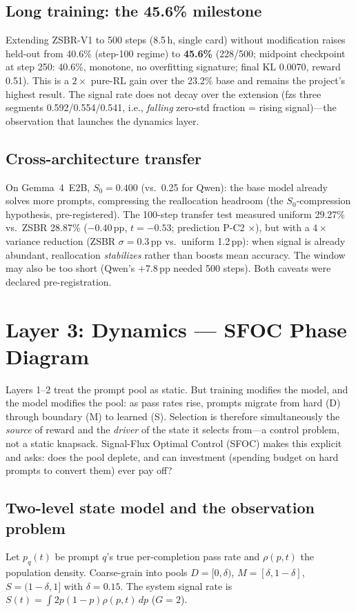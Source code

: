 \documentclass[11pt]{article}
\theoremstyle{definition}
\begin{document}
\subsection{Long training: the 45.6\% milestone}\label{sec:l2-long}
Extending ZSBR-V1 to 500 steps (8.5\,h, single card) without modification raises
held-out from 40.6\% (step-100 regime) to \textbf{45.6\%} (228/500; midpoint
checkpoint at step 250: 40.6\%, monotone, no overfitting signature; final KL
0.0070, reward 0.51). This is a $2\times$ pure-RL gain over the 23.2\% base and
remains the project's highest result. The signal rate does not decay over the
extension (fzs three segments 0.592/0.554/0.541, i.e., \emph{falling} zero-std
fraction = rising signal)---the observation that launches the dynamics layer.

\subsection{Cross-architecture transfer}\label{sec:l2-transfer}
On Gemma~4~E2B, $S_0{=}0.400$ (vs.\ 0.25 for Qwen): the base model already solves
more prompts, compressing the reallocation headroom (the $S_0$-compression
hypothesis, pre-registered). The 100-step transfer test measured uniform 29.27\%
vs.\ ZSBR 28.87\% ($-0.40$\,pp, $t{=}-0.53$; prediction P-C2 $\times$), but with a
$4\times$ variance reduction (ZSBR $\sigma{=}0.3$\,pp vs.\ uniform 1.2\,pp): when
signal is already abundant, reallocation \emph{stabilizes} rather than boosts mean
accuracy. The window may also be too short (Qwen's $+7.8$\,pp needed 500 steps).
Both caveats were declared pre-registration.


\section{Layer 3: Dynamics --- SFOC Phase Diagram}\label{sec:l3}
Layers 1--2 treat the prompt pool as static. But training modifies the model, and
the model modifies the pool: as pass rates rise, prompts migrate from hard (D)
through boundary (M) to learned (S). Selection is therefore simultaneously the
\emph{source} of reward and the \emph{driver} of the state it selects from---a
control problem, not a static knapsack. Signal-Flux Optimal Control (SFOC) makes
this explicit and asks: does the pool deplete, and can investment (spending budget
on hard prompts to convert them) ever pay off?

\subsection{Two-level state model and the observation problem}\label{sec:l3-deconv}
Let $p_q(t)$ be prompt $q$'s true per-completion pass rate and $\rho(p,t)$ the
population density. Coarse-grain into pools $D{=}[0,\delta)$,
$M{=}[\delta,1{-}\delta]$, $S{=}(1{-}\delta,1]$ with $\delta{=}0.15$. The system
signal rate is $S(t)=\int 2p(1-p)\rho(p,t)\,dp$ ($G{=}2$).
\end{document}
